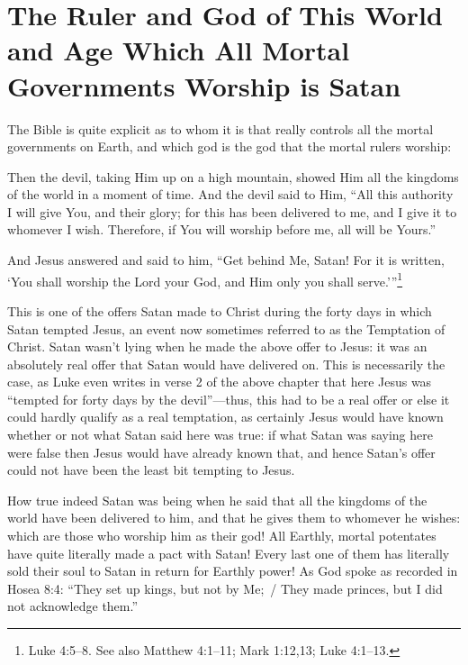\documentclass[letterpaper,12pt]{article}
\newenvironment{squotation}
  {\small\quotation}
  {\endquotation\normalsize}
\begin{document}
\section{The Ruler and God of This World and Age Which All Mortal Governments Worship is Satan}
\label{sec:TheRulerAndGodOfThisWorldAndAgeWhichAllMortalGovernmentsWorshipIsSatan}

The Bible is quite explicit as to whom it is that really controls all the mortal governments on Earth, and which god is the god that the mortal rulers worship:

\begin{squotation}
Then the devil, taking Him up on a high mountain, showed Him all the kingdoms of the world in a moment of time. And the devil said to Him, ``All this authority I will give You, and their glory; for this has been delivered to me, and I give it to whomever I wish. Therefore, if You will worship before me, all will be Yours.''

And Jesus answered and said to him, ``Get behind Me, Satan! For it is written, `You shall worship the Lord your God, and Him only you shall serve.'\thinspace''\footnote{Luke 4:5--8. See also Matthew 4:1--11; Mark 1:12,13; Luke 4:1--13.}
\end{squotation}

This is one of the offers Satan made to Christ during the forty days in which Satan tempted Jesus, an event now sometimes referred to as the Temptation of Christ. Satan wasn't lying when he made the above offer to Jesus: it was an absolutely real offer that Satan would have delivered on. This is necessarily the case, as Luke even writes in verse 2 of the above chapter that here Jesus was ``tempted for forty days by the devil''---thus, this had to be a real offer or else it could hardly qualify as a real temptation, as certainly Jesus would have known whether or not what Satan said here was true: if what Satan was saying here were false then Jesus would have already known that, and hence Satan's offer could not have been the least bit tempting to Jesus.

How true indeed Satan was being when he said that all the kingdoms of the world have been delivered to him, and that he gives them to whomever he wishes: which are those who worship him as their god! All Earthly, mortal potentates have quite literally made a pact with Satan! Every last one of them has literally sold their soul to Satan in return for Earthly power! As God spoke as recorded in Hosea 8:4: ``They set up kings, but not by Me;~/ They made princes, but I did not acknowledge them.''
\end{document}
